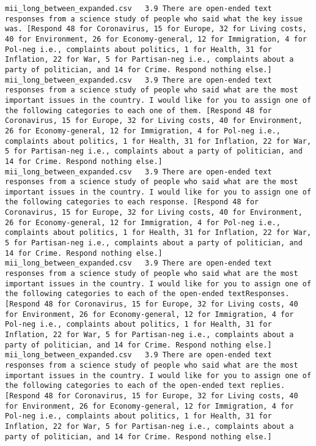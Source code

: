 \begin{lstlisting}[label=lst:promptvariants]
mii_long_between_expanded.csv	3.9	There are open-ended text responses from a science study of people who said what the key issue was. [Respond 48 for Coronavirus, 15 for Europe, 32 for Living costs, 40 for Environment, 26 for Economy-general, 12 for Immigration, 4 for Pol-neg i.e., complaints about politics, 1 for Health, 31 for Inflation, 22 for War, 5 for Partisan-neg i.e., complaints about a party of politician, and 14 for Crime. Respond nothing else.]
mii_long_between_expanded.csv	3.9	There are open-ended text responses from a science study of people who said what are the most important issues in the country. I would like for you to assign one of the following categories to each one of them. [Respond 48 for Coronavirus, 15 for Europe, 32 for Living costs, 40 for Environment, 26 for Economy-general, 12 for Immigration, 4 for Pol-neg i.e., complaints about politics, 1 for Health, 31 for Inflation, 22 for War, 5 for Partisan-neg i.e., complaints about a party of politician, and 14 for Crime. Respond nothing else.]
mii_long_between_expanded.csv	3.9	There are open-ended text responses from a science study of people who said what are the most important issues in the country. I would like for you to assign one of the following categories to each response. [Respond 48 for Coronavirus, 15 for Europe, 32 for Living costs, 40 for Environment, 26 for Economy-general, 12 for Immigration, 4 for Pol-neg i.e., complaints about politics, 1 for Health, 31 for Inflation, 22 for War, 5 for Partisan-neg i.e., complaints about a party of politician, and 14 for Crime. Respond nothing else.]
mii_long_between_expanded.csv	3.9	There are open-ended text responses from a science study of people who said what are the most important issues in the country. I would like for you to assign one of the following categories to each of the open-ended textResponses. [Respond 48 for Coronavirus, 15 for Europe, 32 for Living costs, 40 for Environment, 26 for Economy-general, 12 for Immigration, 4 for Pol-neg i.e., complaints about politics, 1 for Health, 31 for Inflation, 22 for War, 5 for Partisan-neg i.e., complaints about a party of politician, and 14 for Crime. Respond nothing else.]
mii_long_between_expanded.csv	3.9	There are open-ended text responses from a science study of people who said what are the most important issues in the country. I would like for you to assign one of the following categories to each of the open-ended text replies. [Respond 48 for Coronavirus, 15 for Europe, 32 for Living costs, 40 for Environment, 26 for Economy-general, 12 for Immigration, 4 for Pol-neg i.e., complaints about politics, 1 for Health, 31 for Inflation, 22 for War, 5 for Partisan-neg i.e., complaints about a party of politician, and 14 for Crime. Respond nothing else.]

\end{lstlisting}
